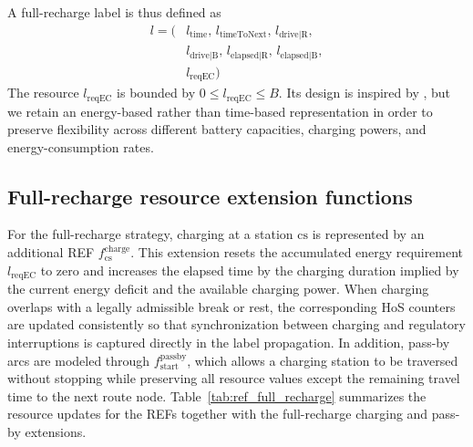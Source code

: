\documentclass[3p,11pt,authoryear]{elsarticle}  %
\begin{document}
A full-recharge label is thus defined as
\[
\begin{aligned}
l = (&l_{\text{time}},\, l_{\text{timeToNext}},\, l_{\text{drive|R}},\\
     &l_{\text{drive|B}},\, l_{\text{elapsed|R}},\, l_{\text{elapsed|B}},\\
     &l_{\text{reqEC}})
\end{aligned}
\]
The resource \(l_{\text{reqEC}}\) is bounded by \(0 \leq l_{\text{reqEC}} \leq B\). Its design is inspired by \citet{desaulniers2016exact}, but we retain an energy-based rather than time-based representation in order to preserve flexibility across different battery capacities, charging powers, and energy-consumption rates.


\subsection{Full-recharge resource extension functions}


For the full-recharge strategy, charging at a station \(\mathrm{cs}\) is represented by an additional REF \(f^{\text{charge}}_{\mathrm{cs}}\). This extension resets the accumulated energy requirement \(l_{\text{reqEC}}\) to zero and increases the elapsed time by the charging duration implied by the current energy deficit and the available charging power. When charging overlaps with a legally admissible break or rest, the corresponding HoS counters are updated consistently so that synchronization between charging and regulatory interruptions is captured directly in the label propagation. In addition, pass-by arcs are modeled through \(f^{\text{passby}}_{\text{start}}\), which allows a charging station to be traversed without stopping while preserving all resource values except the remaining travel time to the next route node. Table~\ref{tab:ref_full_recharge} summarizes the resource updates for the REFs together with the full-recharge charging and pass-by extensions.
\end{document}
